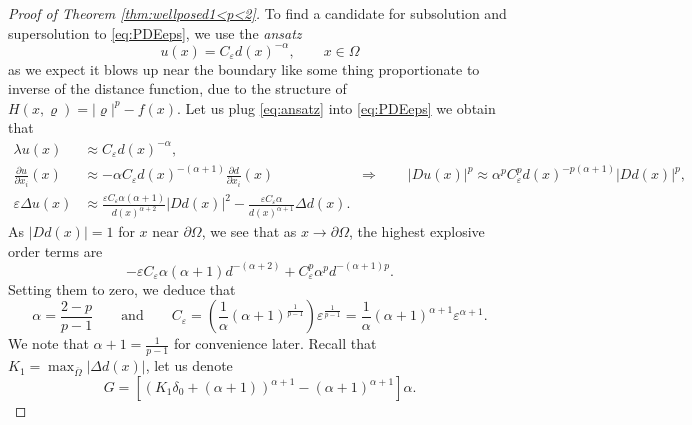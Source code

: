 \documentclass[11pt,reqno]{amsart}
\numberwithin{figure}{section}
\theoremstyle{plain}
\theoremstyle{remark}
\numberwithin{equation}{section}
\begin{document}
\begin{appendices}
\begin{proof} [Proof of Theorem \ref{thm:wellposed1<p<2}] To find a candidate for subsolution and supersolution to \eqref{eq:PDEeps}, we use the \emph{ansatz}
\begin{equation}\label{eq:ansatz}
    u(x) = C_\varepsilon d(x)^{-\alpha}, \qquad x\in \Omega
\end{equation}
as we expect it blows up near the boundary like some thing proportionate to inverse of the distance function, due to the structure of $H(x,\varrho) = |\varrho|^p - f(x)$. Let us plug \eqref{eq:ansatz} into \eqref{eq:PDEeps} we obtain that 
\begin{align*}
    \lambda u(x) &\approx C_\varepsilon d(x)^{-\alpha},\\
    \frac{\partial u}{\partial x_i}(x) &\approx -\alpha C_\varepsilon d(x)^{-(\alpha+1)} \frac{\partial d}{\partial x_i}(x) \qquad\qquad\qquad \Longrightarrow\qquad |Du (x)|^p \approx \alpha^p C_\varepsilon^p d(x)^{-p(\alpha+1)}|D d(x)|^p,\\
    \varepsilon\Delta u(x) &\approx \frac{\varepsilon C_\varepsilon\alpha(\alpha+1)}{d(x)^{\alpha+2}}|D d(x)|^2 - \frac{\varepsilon C_\varepsilon\alpha}{d(x)^{\alpha+1}}\Delta d(x).
\end{align*}
As $|D d(x)| = 1$ for $x$ near $\partial\Omega$, we see that as $x\to \partial \Omega$, the highest explosive order terms are
\begin{equation*}
        -\varepsilon C_\varepsilon \alpha(\alpha+1)d^{-(\alpha+2)} + C_\varepsilon^p \alpha^p d^{-(\alpha+1)p}.
\end{equation*}
Setting them to zero, we deduce that
\begin{equation}\label{e:relation}
    \displaystyle\alpha = \frac{2-p}{p-1} \qquad\text{and}\qquad C_\varepsilon = \left(\frac{1}{\alpha}(\alpha+1)^\frac{1}{p-1}\right) \varepsilon^{\frac{1}{p-1}} = \frac{1}{\alpha}(\alpha+1)^{\alpha+1}\varepsilon^{\alpha+1}.
\end{equation}
We note that $\alpha+1 = \frac{1}{p-1}$ for convenience later. Recall that $K_1 = \max_{\overline{\Omega}}|\Delta d(x)|$, let us denote
\begin{equation*}
    G = \left[\left(K_1\delta_0+(\alpha+1)\right)^{\alpha+1} - (\alpha+1)^{\alpha+1}\right]\alpha.
\end{equation*}


\end{proof}
\end{appendices}
\end{document}
